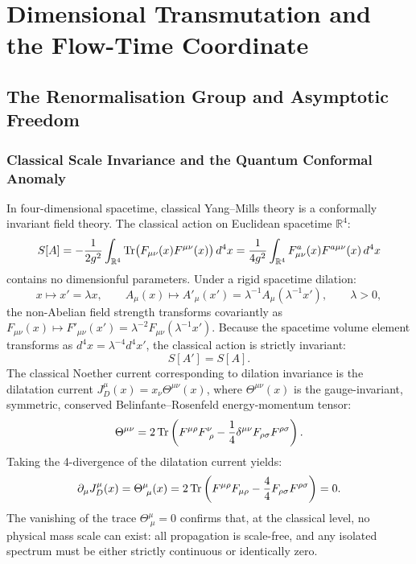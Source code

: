 \chapter{Dimensional Transmutation and the Flow-Time Coordinate}
\label{ch:transmutation}
\label{ch:dimensional_transmutation}

\section{The Renormalisation Group and Asymptotic Freedom}
\label{sec:rg_beta_function}

\subsection{Classical Scale Invariance and the Quantum Conformal Anomaly}
\label{subsec:classical_scale_inv}

In four-dimensional spacetime, classical Yang--Mills theory is a conformally invariant field theory. The classical action on Euclidean spacetime $\mathbb{R}^4$:
\begin{equation}
\label{eq:classical_ym_action_ch3}
S[A] = -\frac{1}{2g^2} \int_{\mathbb{R}^4} \mathrm{Tr}\bigl( F_{\mu\nu}(x) F^{\mu\nu}(x) \bigr) \, d^4x = \frac{1}{4g^2} \int_{\mathbb{R}^4} F_{\mu\nu}^a(x) F^{a\mu\nu}(x) \, d^4x
\end{equation}
contains no dimensionful parameters. Under a rigid spacetime dilation:
\begin{equation}
\label{eq:dilation_transformation}
x \mapsto x' = \lambda x, \qquad A_\mu(x) \mapsto A'_\mu(x') = \lambda^{-1} A_\mu(\lambda^{-1} x'), \qquad \lambda > 0,
\end{equation}
the non-Abelian field strength transforms covariantly as $F_{\mu\nu}(x) \mapsto F'_{\mu\nu}(x') = \lambda^{-2} F_{\mu\nu}(\lambda^{-1} x')$. Because the spacetime volume element transforms as $d^4x = \lambda^{-4} d^4x'$, the classical action is strictly invariant:
\begin{equation}
S[A'] = S[A].
\end{equation}
The classical Noether current corresponding to dilation invariance is the dilatation current $J_D^\mu(x) = x_\nu \Theta^{\mu\nu}(x)$, where $\Theta^{\mu\nu}(x)$ is the gauge-invariant, symmetric, conserved Belinfante--Rosenfeld energy-momentum tensor:
\begin{equation}
\label{eq:classical_em_tensor}
\Theta^{\mu\nu} = 2 \, \mathrm{Tr}\left( F^{\mu\rho} F^\nu_{\ \rho} - \frac{1}{4} \delta^{\mu\nu} F_{\rho\sigma} F^{\rho\sigma} \right).
\end{equation}
Taking the 4-divergence of the dilatation current yields:
\begin{equation}
\partial_\mu J_D^\mu(x) = \Theta^\mu_{\ \mu}(x) = 2 \, \mathrm{Tr}\left( F^{\mu\rho} F_{\mu\rho} - \frac{4}{4} F_{\rho\sigma} F^{\rho\sigma} \right) = 0.
\end{equation}
The vanishing of the trace $\Theta^\mu_{\ \mu} = 0$ confirms that, at the classical level, no physical mass scale can exist: all propagation is scale-free, and any isolated spectrum must be either strictly continuous or identically zero.

